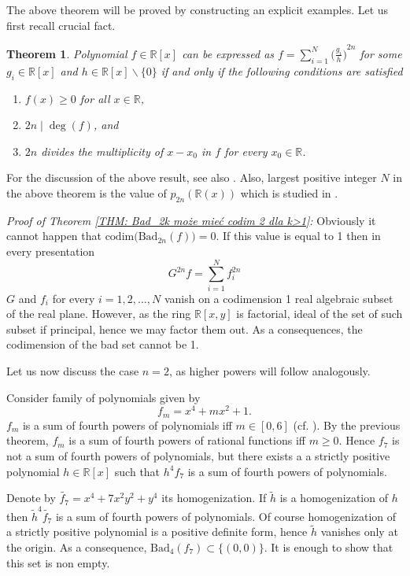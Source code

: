 \documentclass[12pt,reqno]{amsart}   	%
\newtheorem{thm}{Theorem}[section]
\theoremstyle{remark}
\newcommand{\R}{\mathbb{R}}
\begin{document}
The above theorem will be proved by constructing an explicit examples. Let us first recall crucial fact.


\begin{thm}\cite[Theorem 1.9]{becker1982}
    Polynomial $f \in \R[x]$ can be expressed as
    $
    f = \sum_{i=1}^N {\big(\frac{g_i}{h}\big)}^{2n}
    $
    for some $g_i \in \R[x]$ and $h \in \R[x] \backslash \{0\}$
    if and only if the following conditions are satisfied
    \begin{enumerate}
        \item $f(x) \geq 0$ for all $x \in \R$,
        \item $2n \mid \deg(f)$, and
        \item $2n$ divides the multiplicity of $x - x_0$ in $f$ for every $x_0 \in \R$.
    \end{enumerate}
\end{thm}
For the discussion of the above result, see also \cite[Introduction]{clpr1996}. Also, largest positive integer $N$ in the above theorem is the value of $p_{2n}(\R(x))$ which is studied in \cite{clpr1996}.

\noindent
\textit{Proof of Theorem \ref{THM: Bad_2k może mieć codim 2 dla k>1}:}
Obviously it cannot happen that  $\mathrm{codim}\big(\mathrm{Bad}_{2n}(f)\big) =0$. If this value is equal to 1 then in every presentation $$G^{2n}f =\sum_{i=1}^N f_i^{2n}$$ $G$ and $f_i$ for every $i=1,2,\dots, N$ vanish on a codimension 1 real algebraic subset of the real plane. However, as the ring $\R[x,y]$ is factorial, ideal of the set of such subset if principal, hence we may factor them out. As a consequences, the codimension of the bad set cannot be 1.

Let us now discuss the case $n=2$, as higher powers will follow analogously. 

Consider family of polynomials given by 
$$f_m = x^4+mx^2+1.$$
$f_m$ is a sum of fourth powers of polynomials iff $m\in [0,6]$ (cf. 
\cite[Exercise 7.4.4]{pd2001}). By the previous theorem, $f_m$ is a sum of fourth powers of rational functions iff $m\geq 0.$ Hence $f_7$ is not a sum of fourth powers of polynomials, but there exists a a strictly positive polynomial $h \in \R[x]$ such that $h^4f_7$ is a sum of fourth powers of polynomials. 

Denote by $\widetilde{f_7}=x^4+7x^2y^2+y^4$ its homogenization. If $\widetilde{h}$ is a homogenization of $h$ then $\widetilde{h}^4\widetilde{f_7}$ is a sum of fourth powers of polynomials. Of course homogenization of a strictly positive polynomial is a positive definite form, hence $\widetilde{h}$ vanishes only at the origin. As a consequence, $\mathrm{Bad}_4(f_7) \subset \{(0,0) \}$. It is enough to show that this set is non empty. 
\end{document}
